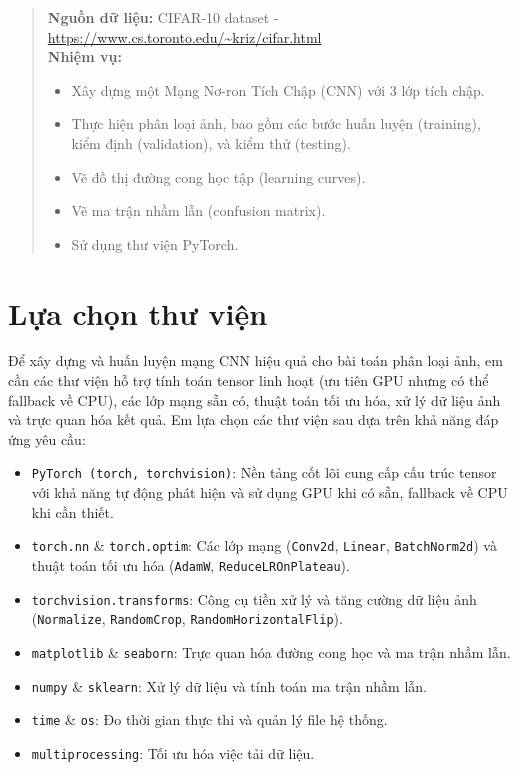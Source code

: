 \documentclass[12pt, a4paper, openany]{report}
\begin{document}
\begin{abstract}
\noindent \textbf{Nguồn dữ liệu:} CIFAR-10 dataset - \url{https://www.cs.toronto.edu/~kriz/cifar.html} \\
\textbf{Nhiệm vụ:}
\begin{itemize}
    \item Xây dựng một Mạng Nơ-ron Tích Chập (CNN) với 3 lớp tích chập.
    \item Thực hiện phân loại ảnh, bao gồm các bước huấn luyện (training), kiểm định (validation), và kiểm thử (testing).
    \item Vẽ đồ thị đường cong học tập (learning curves).
    \item Vẽ ma trận nhầm lẫn (confusion matrix).
    \item Sử dụng thư viện PyTorch.
\end{itemize}
\end{abstract}
\clearpage

\chapter{Lựa chọn thư viện}
Để xây dựng và huấn luyện mạng CNN hiệu quả cho bài toán phân loại ảnh, em cần các thư viện hỗ trợ tính toán tensor linh hoạt (ưu tiên GPU nhưng có thể fallback về CPU), các lớp mạng sẵn có, thuật toán tối ưu hóa, xử lý dữ liệu ảnh và trực quan hóa kết quả.
Em lựa chọn các thư viện sau dựa trên khả năng đáp ứng yêu cầu:
\begin{itemize}
    \item \texttt{PyTorch (torch, torchvision)}: Nền tảng cốt lõi cung cấp cấu trúc tensor với khả năng tự động phát hiện và sử dụng GPU khi có sẵn, fallback về CPU khi cần thiết.
    \item \texttt{torch.nn} \& \texttt{torch.optim}: Các lớp mạng (\texttt{Conv2d}, \texttt{Linear}, \texttt{BatchNorm2d}) và thuật toán tối ưu hóa (\texttt{AdamW}, \texttt{ReduceLROnPlateau}).
    \item \texttt{torchvision.transforms}: Công cụ tiền xử lý và tăng cường dữ liệu ảnh (\texttt{Normalize}, \texttt{RandomCrop}, \texttt{RandomHorizontalFlip}).
    \item \texttt{matplotlib} \& \texttt{seaborn}: Trực quan hóa đường cong học và ma trận nhầm lẫn.
    \item \texttt{numpy} \& \texttt{sklearn}: Xử lý dữ liệu và tính toán ma trận nhầm lẫn.
    \item \texttt{time} \& \texttt{os}: Đo thời gian thực thi và quản lý file hệ thống.
    \item \texttt{multiprocessing}: Tối ưu hóa việc tải dữ liệu.
\end{itemize}
\end{document}
